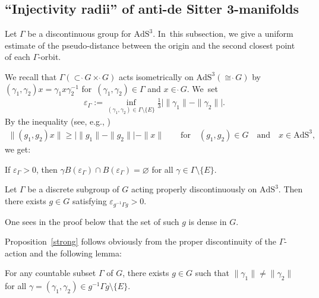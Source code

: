 \subsection{``Injectivity radii'' of anti-de Sitter 3-manifolds}\label{inj-radii}
Let $\Gamma$ be a discontinuous group for $\mathrm{AdS}^{3}$. In~this subsection, we give a uniform estimate of the pseudo-distance
between the origin and the second closest point of each $\Gamma$-orbit.

We recall that $\Gamma(\subset \grave{\ }G\times\grave{\ }G)$
acts isometrically on $\mathrm{AdS}^{3}(\cong\grave{\ }G)$ by
$(\gamma_{1},\gamma_{2})x=\gamma_{1} x\gamma_{2}^{-1}$
for~$(\gamma_{1},\gamma_{2})\in\Gamma$ and $x\in\grave{\ }G$. We~set
\begin{align}
\label{varepsilon}
\varepsilon_{\Gamma} := \inf_{(\gamma_1,\gamma_2)\in
\Gamma\setminus\{E\}}
\frac{1}{3}\big|\|\gamma_1\|-\|\gamma_2\|\big|.
\end{align}
By the inequality (see, e.g., \cite[Lemma~5.5]{Kan19})
\begin{gather*}
\|(g_1,g_2)x\|\geq \big | \|g_1\|-\|g_2\| \big | - \|x\|\qquad
\text{for}\quad (g_1,g_2) \in G \quad\text{and}\quad x \in \mathrm{AdS}^{3},
\end{gather*}
we get:
\begin{Lemma}\label{inj-rad}
If $\varepsilon_{\Gamma}>0$, then
$\gamma B(\varepsilon_{\Gamma}) \cap B(\varepsilon_{\Gamma})
= \varnothing$
for all $\gamma\in \Gamma\setminus\{E\}$.
\end{Lemma}

\begin{Proposition}\label{strong}
Let $\Gamma$ be a discrete subgroup of $G$ acting properly discontinuously
on $\mathrm{AdS}^{3}$.
Then there exists $g \in G$
satisfying $\varepsilon_{g^{-1}\Gamma g} > 0$.
\end{Proposition}
\begin{Remark}
One sees in the proof below that
the set of such $g$ is dense in $G$.
\end{Remark}
Proposition~\ref{strong} follows obviously
from the proper discontinuity of the $\Gamma$-action and the following lemma:
\begin{Lemma}\label{weak}
For any countable subset $\Gamma$ of
$G$,
there exists
$g\in G$
such that $\|\gamma_1\|\neq\|\gamma_2\|$
for all $\gamma=(\gamma_1,\gamma_2)\in
g^{-1}\Gamma g \setminus \{E\}$.
\end{Lemma}

